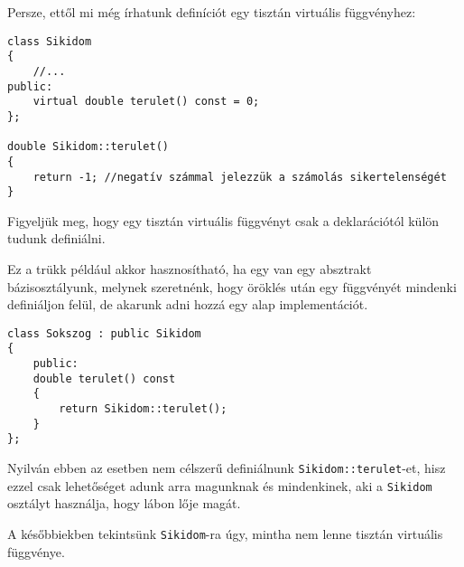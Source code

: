 \documentclass[a4paper,11.5pt,table]{article}
\begin{document}
	Persze, ettől mi még írhatunk definíciót egy tisztán virtuális függvényhez:
\begin{lstlisting}
class Sikidom
{
	//...
public:
	virtual double terulet() const = 0;
};

double Sikidom::terulet()
{
	return -1; //negatív számmal jelezzük a számolás sikertelenségét
}
\end{lstlisting}
	Figyeljük meg, hogy egy tisztán virtuális függvényt csak a deklarációtól külön tudunk definiálni. 
	
	Ez a trükk például akkor hasznosítható, ha egy van egy absztrakt bázisosztályunk, melynek szeretnénk, hogy öröklés után egy függvényét mindenki definiáljon felül, de akarunk adni hozzá egy alap implementációt.
\begin{lstlisting}
class Sokszog : public Sikidom
{
	public:
	double terulet() const
	{
		return Sikidom::terulet();
	}
};
\end{lstlisting}
	\begin{note}
		Nyilván ebben az esetben nem célszerű definiálnunk \texttt{Sikidom::terulet}-et, hisz ezzel csak lehetőséget adunk arra magunknak és mindenkinek, aki a \texttt{Sikidom} osztályt használja, hogy lábon lője magát.
	\end{note}
	A későbbiekben tekintsünk \texttt{Sikidom}-ra úgy, mintha nem lenne tisztán virtuális függvénye.
\end{document}
